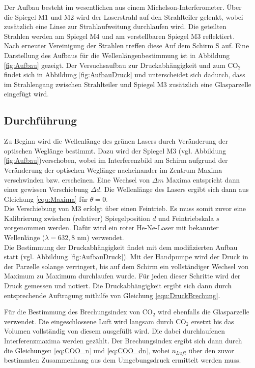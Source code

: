 \documentclass[12pt,a4paper]{article}
\begin{document}
Der Aufbau besteht im wesentlichen aus einem Michelson-Interferometer. Über die Spiegel M1 und M2 wird der Laserstrahl auf den Strahlteiler gelenkt, wobei zusätzlich eine Linse zur Strahlaufweitung durchlaufen wird. Die geteilten Strahlen werden am Spiegel M4 und am verstellbaren Spiegel M3 reflektiert. Nach erneuter Vereinigung der Strahlen treffen diese Auf dem Schirm S auf. Eine Darstellung des Aufbaus für die Wellenlängenbestimmung ist in Abbildung \ref{fig:Aufbau} gezeigt. Der Versuchsaufbau zur Druckabhängigkeit und zum $\text{CO}_2$ findet sich in Abbildung \ref{fig:AufbauDruck} und unterscheidet sich dadurch, dass im Strahlengang zwischen Strahlteiler und Spiegel M3 zusätzlich eine Glasparzelle eingefügt wird.

\subsection{Durchführung}


Zu Beginn wird die Wellenlänge des grünen Lasers durch Veränderung der optischen Weglänge bestimmt.
Dazu wird der Spiegel M3 (vgl. Abbildung \ref{fig:Aufbau})verschoben, wobei im Interferenzbild am Schirm aufgrund der Veränderung der optischen Weglänge nacheinander im Zentrum Maxima verschwinden bzw. erscheinen. Eine Wechsel von $\Delta m$ Maxima entspricht dann einer gewissen Verschiebung $\Delta d$. Die Wellenlänge des Lasers ergibt sich dann aus Gleichung \ref{equ:Maxima} für $\theta = 0$.\\

Die Verschiebung von M3 erfolgt über einen Feintrieb. Es muss somit zuvor eine Kalibrierung zwischen (relativer) Spiegelposition $d$ und Feintriebskala $s$ vorgenommen werden. Dafür wird ein roter He-Ne-Laser mit bekannter Wellenlänge ($\lambda = 632,8$ nm) verwendet.\\


Die Bestimmung der Druckabhängigkeit findet mit dem modifizierten Aufbau statt (vgl. Abbildung \ref{fig:AufbauDruck}). Mit der Handpumpe wird der Druck in der Parzelle solange verringert, bis auf dem Schirm ein vollständiger Wechsel von Maximum zu Maximum durchlaufen wurde. Für jeden dieser Schritte wird der Druck gemessen und notiert. Die Druckabhängigkeit ergibt sich dann durch entsprechende Auftragung mithilfe von Gleichung \ref{equ:DruckBrechung}.

Für die Bestimmung des Brechungsindex von $\text{CO}_2$ wird ebenfalls die Glasparzelle verwendet. Die eingeschlossene Luft wird langsam durch $\text{CO}_2$ ersetzt bis das Volumen vollständig von diesem ausgefüllt wird. Die dabei durchlaufenen Interferenzmaxima werden gezählt. Der Brechungsindex ergibt sich dann durch die Gleichungen \ref{eq:COO_n} und \ref{eq:COO_dn}, wobei $n_{Luft}$ über den zuvor bestimmten Zusammenhang aus dem Umgebungsdruck ermittelt werden muss.
\end{document}
